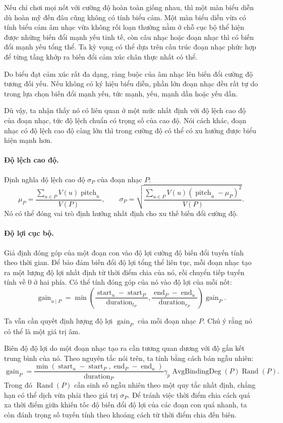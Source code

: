 \documentclass[11pt]{article}
\begin{document}
Nếu chỉ chơi mọi nốt với cường độ hoàn toàn giống nhau, thì một màn biểu diễn
dù hoàn mỹ đến đâu cũng không có tính biểu cảm. Một màn biểu diễn vừa có tính
biểu cảm âm nhạc vừa không rối loạn thường nằm ở chỗ cục bộ thể hiện được
những biến đổi mạnh yếu tinh tế, còn câu nhạc hoặc đoạn nhạc thì có biến đổi
mạnh yếu tổng thể. Ta kỳ vọng có thể dựa trên cấu trúc đoạn nhạc phức hợp để
từng tầng khớp ra biến đổi cảm xúc chân thực nhất có thể.

Do biểu đạt cảm xúc rất đa dạng, ràng buộc của âm nhạc lên biến đổi cường độ
tương đối yếu. Nếu không có ký hiệu biểu diễn, phần lớn đoạn nhạc đều rất tự
do trong lựa chọn biến đổi mạnh yếu, tức mạnh, yếu, mạnh dần hoặc yếu dần.

Dù vậy, ta nhận thấy nó có liên quan ở một mức nhất định với độ lệch cao độ
của đoạn nhạc, tức độ lệch chuẩn có trọng số của cao độ. Nói cách khác, đoạn
nhạc có độ lệch cao độ càng lớn thì trong cường độ có thể có xu hướng được
biểu hiện mạnh hơn.

\paragraph{Độ lệch cao độ.}
Định nghĩa độ lệch cao độ \(\sigma_P\) của đoạn nhạc \(P\):
\[
  \mu_P=\frac{\sum_{u\in P}V(u)\operatorname{pitch}_u}{V(P)},\qquad
  \sigma_P=
  \sqrt{\frac{\sum_{u\in P}V(u)(\operatorname{pitch}_u-\mu_P)^2}{V(P)}}.
\]
Nó có thể đóng vai trò định hướng nhất định cho xu thế biến đổi cường độ.

\paragraph{Độ lợi cục bộ.}
Giả định đóng góp của một đoạn con vào độ lợi cường độ biến đổi tuyến tính
theo thời gian. Để bảo đảm biến đổi độ lợi tổng thể liên tục, mỗi đoạn nhạc
tạo ra một lượng độ lợi nhất định từ thời điểm chia của nó, rồi chuyển tiếp
tuyến tính về \(0\) ở hai phía. Có thể tính đóng góp của nó vào độ lợi của
mỗi nốt:
\[
  \operatorname{gain}_{u\mid P}=
  \min\left(
    \frac{\operatorname{start}_u-\operatorname{start}_P}
         {\operatorname{duration}_{l_P}},
    \frac{\operatorname{end}_P-\operatorname{end}_u}
         {\operatorname{duration}_{r_P}}
  \right)\operatorname{gain}_P.
\]

Ta vẫn cần quyết định lượng độ lợi \(\operatorname{gain}_P\) của mỗi đoạn
nhạc \(P\). Chú ý rằng nó có thể là một giá trị âm.

Biên độ độ lợi do một đoạn nhạc tạo ra cần tương quan dương với độ gắn kết
trung bình của nó. Theo nguyên tắc nói trên, ta tính bằng cách bán ngẫu nhiên:
\[
  \operatorname{gain}_P=
  \frac{\min(\operatorname{start}_u-\operatorname{start}_P,
             \operatorname{end}_P-\operatorname{end}_u)}
       {\operatorname{duration}_P}
  \gamma_p\operatorname{AvgBindingDeg}(P)\operatorname{Rand}(P).
\]
Trong đó \(\operatorname{Rand}(P)\) cần sinh số ngẫu nhiên theo một quy tắc
nhất định, chẳng hạn có thể dịch vừa phải theo giá trị \(\sigma_P\). Để tránh
việc thời điểm chia cách quá xa thời điểm giữa khiến tốc độ biến đổi độ lợi
của các đoạn con quá nhanh, ta còn đánh trọng số tuyến tính theo khoảng cách
từ thời điểm chia đến biên.
\end{document}
